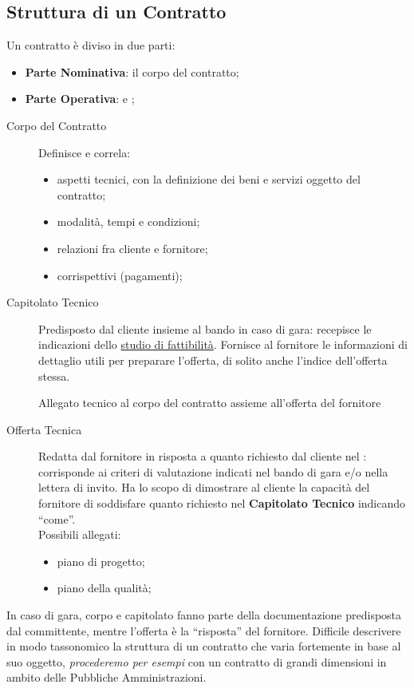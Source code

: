 \subsection{Struttura di un Contratto}\label{sub:cv_struttura_di_un_contratto} %
Un contratto è diviso in due parti:
\begin{itemize}
    \item \textbf{Parte Nominativa}: il corpo del contratto;
    \item \textbf{Parte Operativa}:  e ;
\end{itemize}
\begin{description}
    \item[Corpo del Contratto] Definisce e correla:
        \begin{itemize}
            \item aspetti tecnici, con la definizione dei beni e servizi oggetto del contratto;
            \item modalità, tempi e condizioni;
            \item relazioni fra cliente e fornitore;
            \item corrispettivi (pagamenti);
        \end{itemize}
    \item[Capitolato Tecnico] Predisposto dal cliente insieme al bando in caso di gara: recepisce le indicazioni dello \hyperref[chap:studio_di_fattibilita]{studio di fattibilità}.
        Fornisce al fornitore le informazioni di dettaglio utili per preparare l'offerta, di solito anche l'indice dell'offerta stessa.
        \begin{note}
            Allegato tecnico al corpo del contratto assieme all'offerta del fornitore
        \end{note}
    \item[Offerta Tecnica] Redatta dal fornitore in risposta a quanto richiesto dal cliente nel : corrisponde ai criteri di valutazione indicati nel bando di gara e/o nella lettera di invito.
        Ha lo scopo di dimostrare al cliente la capacità del fornitore di soddisfare quanto richiesto nel \textbf{Capitolato Tecnico} indicando ``come''.
        \\
        Possibili allegati:
        \begin{itemize}
            \item piano di progetto;
            \item piano della qualità;
        \end{itemize}
\end{description}
\begin{warning}
    In caso di gara, corpo e capitolato fanno parte della documentazione predisposta dal committente, mentre l'offerta è la ``risposta'' del fornitore.
    \emptyln{}
    Difficile descrivere in modo tassonomico la struttura di un contratto che varia fortemente in base al suo oggetto, \textit{procederemo per esempi} con un contratto di grandi dimensioni in ambito delle Pubbliche Amministrazioni.
\end{warning}
%
